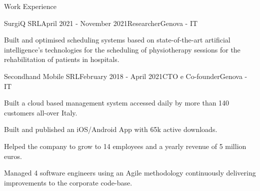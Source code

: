 \documentclass{resume} %
\begin{document}
\begin{rSection}{Work Experience}


\begin{rSubsection}{SurgiQ SRL}{April 2021 - November 2021}{Researcher}{Genova - IT}
\item Built and optimised scheduling systems based on state-of-the-art artificial intelligence's technologies for the scheduling of physiotherapy sessions for the rehabilitation of patients in hospitals.
\end{rSubsection}

\begin{rSubsection}{Secondhand Mobile SRL}{February 2018 - April 2021}{CTO e Co-founder}{Genova - IT}
\item Built a cloud based management system accessed daily by more than 140 customers all-over Italy. 
\item Built and published an iOS/Android App with 65k active downloads. 
\item Helped the company to grow to 14 employees and a yearly revenue of 5 million euros. 
\item Managed 4 software engineers using an Agile methodology continuously delivering improvements to the corporate code-base.
\end{rSubsection}




\end{rSection}



\end{document}
